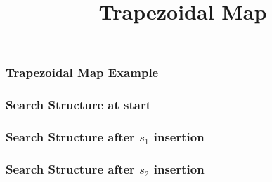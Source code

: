 \documentclass{beamer}
\title{Trapezoidal Map}
\begin{document}
\maketitle

\begin{frame}
    \frametitle{Trapezoidal Map Example}

    \begin{figure}
    \end{figure}
\end{frame}

\begin{frame}
    \frametitle{Search Structure at start}

    \begin{figure}
        \begin{minipage}[h]{0.39\linewidth}
        \end{minipage}
        \begin{minipage}[h]{0.59\linewidth}
        \end{minipage}
    \end{figure}
\end{frame}

\begin{frame}
    \frametitle{Search Structure after ${s_1}$ insertion}

    \begin{figure}
        \begin{minipage}[h]{0.39\linewidth}
        \end{minipage}
        \begin{minipage}[h]{0.59\linewidth}
        \end{minipage}
    \end{figure}
\end{frame}

\begin{frame}
    \frametitle{Search Structure after ${s_2}$ insertion}

    \begin{figure}
        \begin{minipage}[h]{0.39\linewidth}
        \end{minipage}
        \begin{minipage}[h]{0.59\linewidth}
        \end{minipage}
    \end{figure}
\end{frame}
\end{document}
